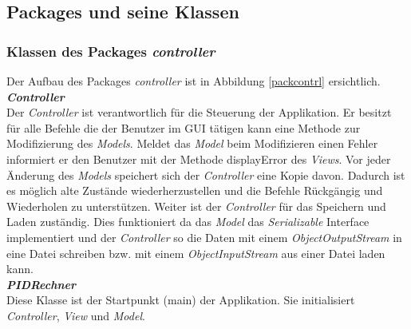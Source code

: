 \newpage
\subsection{Packages und seine Klassen}

\subsubsection{Klassen des Packages \textit{controller}}
Der Aufbau des Packages \textit{controller} ist in Abbildung \ref{packcontrl} ersichtlich.\\

\textit{\textbf{Controller}}\\
Der \textit{Controller} ist verantwortlich für die Steuerung der Applikation. Er besitzt für alle Befehle die der Benutzer im GUI tätigen kann eine Methode zur Modifizierung des \textit{Models}. Meldet das \textit{Model} beim Modifizieren einen Fehler informiert er den Benutzer mit der Methode displayError des \textit{Views}. Vor jeder Änderung des \textit{Models} speichert sich der \textit{Controller} eine Kopie davon. Dadurch ist es möglich alte Zustände wiederherzustellen und die Befehle Rückgängig und Wiederholen zu unterstützen. Weiter ist der \textit{Controller} für das Speichern und Laden zuständig. Dies funktioniert da das \textit{Model} das \textit{Serializable} Interface implementiert und der \textit{Controller} so die Daten mit einem \textit{ObjectOutputStream} in eine Datei schreiben bzw. mit einem \textit{ObjectInputStream} aus einer Datei laden kann.\\

\textit{\textbf{PIDRechner}}\\
Diese Klasse ist der Startpunkt (main) der Applikation. Sie initialisiert \textit{Controller}, \textit{View} und \textit{Model}.

